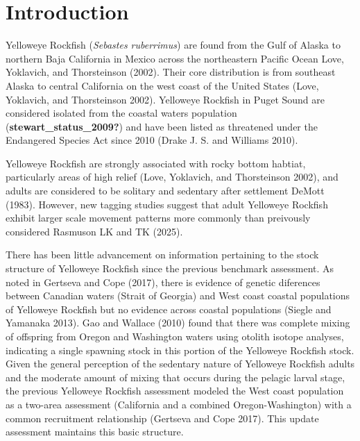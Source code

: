 \documentclass[
]{scrartcl}
\begin{document}
\newpage{}

\setlength{\parskip}{5mm plus1mm minus1mm}
\setcounter{page}{1}
\setcounter{section}{0}
\renewcommand{\thefigure}{\arabic{figure}}
\renewcommand{\thetable}{\arabic{table}}
\setcounter{table}{0}
\setcounter{figure}{0}

\section{Introduction}\label{introduction}

Yelloweye Rockfish (\emph{Sebastes ruberrimus}) are found from the Gulf
of Alaska to northern Baja California in Mexico across the northeastern
Pacific Ocean Love, Yoklavich, and Thorsteinson (2002). Their core
distribution is from southeast Alaska to central California on the west
coast of the United States (Love, Yoklavich, and Thorsteinson 2002).
Yelloweye Rockfish in Puget Sound are considered isolated from the
coastal waters population (\textbf{stewart\_status\_2009?}) and have
been listed as threatened under the Endangered Species Act since 2010
(Drake J. S. and Williams 2010).

Yelloweye Rockfish are strongly associated with rocky bottom habtiat,
particularly areas of high relief (Love, Yoklavich, and Thorsteinson
2002), and adults are considered to be solitary and sedentary after
settlement DeMott (1983). However, new tagging studies suggest that
adult Yelloweye Rockfish exhibit larger scale movement patterns more
commonly than preivously considered Rasmuson LK and TK (2025).

There has been little advancement on information pertaining to the stock
structure of Yelloweye Rockfish since the previous benchmark assessment.
As noted in Gertseva and Cope (2017), there is evidence of genetic
diferences between Canadian waters (Strait of Georgia) and West coast
coastal populations of Yelloweye Rockfish but no evidence across coastal
populations (Siegle and Yamanaka 2013). Gao and Wallace (2010) found
that there was complete mixing of offspring from Oregon and Washington
waters using otolith isotope analyses, indicating a single spawning
stock in this portion of the Yelloweye Rockfish stock. Given the general
perception of the sedentary nature of Yelloweye Rockfish adults and the
moderate amount of mixing that occurs during the pelagic larval stage,
the previous Yelloweye Rockfish assessment modeled the West coast
population as a two-area assessment (California and a combined
Oregon-Washington) with a common recruitment relationship (Gertseva and
Cope 2017). This update assessment maintains this basic structure.
\end{document}

